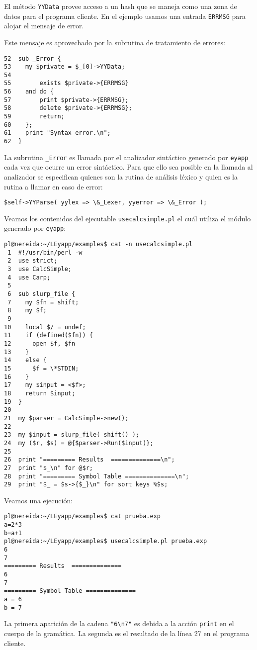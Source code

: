 El método \verb|YYData| provee acceso a un hash que se maneja 
como una zona de datos para el programa cliente.
En el ejemplo usamos una entrada \verb|ERRMSG| para alojar 
el mensaje de error.

Este mensaje es aprovechado por la subrutina
de tratamiento de errores:

\begin{verbatim}
52  sub _Error {
53    my $private = $_[0]->YYData;
54
55        exists $private->{ERRMSG}
56    and do {
57        print $private->{ERRMSG};
58        delete $private->{ERRMSG};
59        return;
60    };
61    print "Syntax error.\n";
62  }
\end{verbatim}

La subrutina \verb|_Error| es llamada
por el analizador sintáctico 
generado por \verb|eyapp| cada vez que ocurre un error
sintáctico. Para que ello sea posible
en la llamada 
al analizador se especifican quienes son la rutina de análisis
léxico y quien es la rutina a llamar en caso de error:

\begin{verbatim}
$self->YYParse( yylex => \&_Lexer, yyerror => \&_Error );
\end{verbatim}



Veamos los contenidos del ejecutable \verb|usecalcsimple.pl| el cuál
utiliza el módulo generado por \verb|eyapp|:
\begin{verbatim}
pl@nereida:~/LEyapp/examples$ cat -n usecalcsimple.pl
 1  #!/usr/bin/perl -w
 2  use strict;
 3  use CalcSimple;
 4  use Carp;
 5
 6  sub slurp_file {
 7    my $fn = shift;
 8    my $f;
 9
10    local $/ = undef;
11    if (defined($fn)) {
12      open $f, $fn
13    }
14    else {
15      $f = \*STDIN;
16    }
17    my $input = <$f>;
18    return $input;
19  }
20
21  my $parser = CalcSimple->new();
22
23  my $input = slurp_file( shift() );
24  my ($r, $s) = @{$parser->Run($input)};
25
26  print "========= Results  ==============\n";
27  print "$_\n" for @$r;
28  print "========= Symbol Table ==============\n";
29  print "$_ = $s->{$_}\n" for sort keys %$s;
\end{verbatim}


Veamos una ejecución:

\begin{verbatim}
pl@nereida:~/LEyapp/examples$ cat prueba.exp
a=2*3
b=a+1
pl@nereida:~/LEyapp/examples$ usecalcsimple.pl prueba.exp
6
7
========= Results  ==============
6
7
========= Symbol Table ==============
a = 6
b = 7
\end{verbatim}
La primera aparición de la cadena 
\verb|"6\n7"| es debida a la acción \verb|print| en el cuerpo 
de la gramática. La segunda es el resultado de la línea 27 en el programa cliente.

